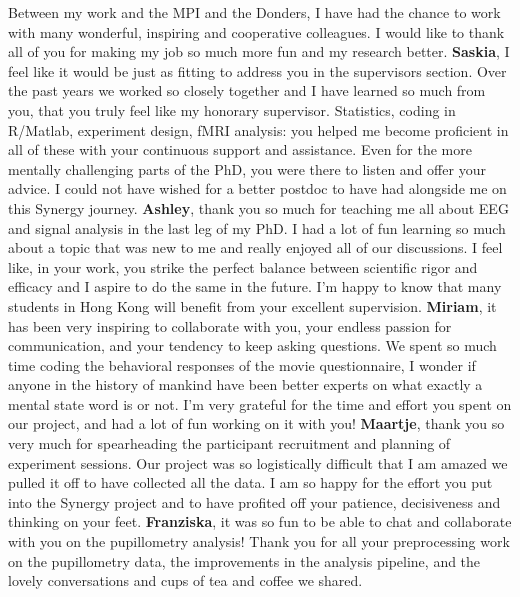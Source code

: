 Between my work and the MPI and the Donders, I have had the chance to work with many wonderful, inspiring and cooperative colleagues. I would like to thank all of you for making my job so much more fun and my research better. \newline
\textbf{Saskia}, I feel like it would be just as fitting to address you in the supervisors section. Over the past years we worked so closely together and I have learned so much from you, that you truly feel like my honorary supervisor. Statistics, coding in R/Matlab, experiment design, fMRI analysis: you helped me become proficient in all of these with your continuous support and assistance. Even for the more mentally challenging parts of the PhD, you were there to listen and offer your advice. I could not have wished for a better postdoc to have had alongside me on this Synergy journey. \newline
\textbf{Ashley}, thank you so much for teaching me all about EEG and signal analysis in the last leg of my PhD. I had a lot of fun learning so much about a topic that was new to me and really enjoyed all of our discussions. I feel like, in your work, you strike the perfect balance between scientific rigor and efficacy and I aspire to do the same in the future. I'm happy to know that many students in Hong Kong will benefit from your excellent supervision. \newline
\textbf{Miriam}, it has been very inspiring to collaborate with you, your endless passion for communication, and your tendency to keep asking questions. We spent so much time coding the behavioral responses of the movie questionnaire, I wonder if anyone in the history of mankind have been better experts on what exactly a mental state word is or not. I'm very grateful for the time and effort you spent on our project, and had a lot of fun working on it with you! \newline
\textbf{Maartje}, thank you so very much for spearheading the participant recruitment and planning of experiment sessions. Our project was so logistically difficult that I am amazed we pulled it off to have collected all the data. I am so happy for the effort you put into the Synergy project and to have profited off your patience, decisiveness and thinking on your feet. \newline
\textbf{Franziska}, it was so fun to be able to chat and collaborate with you on the pupillometry analysis! Thank you for all your preprocessing work on the pupillometry data, the improvements in the analysis pipeline, and the lovely conversations and cups of tea and coffee we shared. \newline
